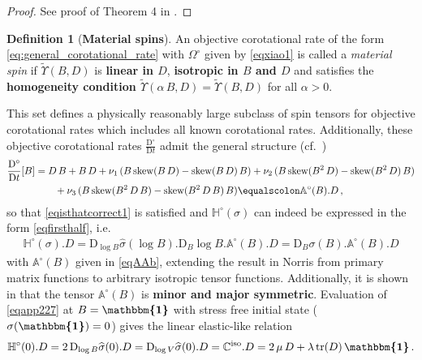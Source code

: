 \documentclass[10pt]{article}
\newcounter{theoremCounter}
\numberwithin{theoremCounter}{section}
\theoremstyle{plain}
\theoremstyle{definition}
\newtheorem{definition}[theoremCounter]{Definition}
\newcommand{\id}{{\boldsymbol{\mathbbm{1}}}}
\newcommand{\DD}{\mathrm{D}}
\DeclareMathOperator{\tr}{tr}
\DeclareMathOperator{\iso}{iso}
\def\tr{\textnormal{tr}}
\def\sk{\textnormal{skew}}
\def\C{\mathbb{C}}
\def\H{\mathbb{H}}
\numberwithin{equation}{section}
\begin{document}
%
\begin{proof}
See proof of Theorem 4 in \cite[p.~22]{xiao98_1}.
\end{proof}
%
\begin{definition}[\textbf{Material spins}] \label{appmaterialspins}
An objective corotational rate of the form \eqref{eq:general_corotational_rate} with $\Omega^{\circ}$ given by \eqref{eqxiao1} is called a \emph{material spin} if $\widetilde \Upsilon(B,D)$ is \textbf{linear in $D$}, \textbf{isotropic in $B$ and $D$} and satisfies the \textbf{homogeneity condition $\widetilde \Upsilon(\alpha \, B, D) = \widetilde \Upsilon(B,D)$} for all $\alpha > 0$.
\end{definition}
%
\noindent This set defines a physically reasonably large subclass of spin tensors for objective corotational rates which includes all known corotational rates. Additionally, these objective corotational rates $\frac{\DD^{\circ}}{\DD t}$ admit the general structure (cf.~\cite{neffkoro2024})
	\begin{equation}
	\label{eqAAb}
	\begin{alignedat}{2}
	\frac{\DD^{\circ}}{\DD t}[B] &= D \, B + B \, D + \nu_1 \, (B \, \sk(B \, D) - \sk(B \, D) \, B) +\nu_2 \, (B \, \sk(B^2 \, D) - \sk(B^2 \, D) \, B) \\
	&\qquad + \nu_3 \, (B \, \sk(B^2 \, D \, B) - \sk(B^2 \, D \, B) \, B) \equalscolon \mathbb{A}^{\circ}(B).D \, ,
	\end{alignedat}
	\end{equation}
so that \eqref{eqisthatcorrect1} is satisfied and $\H^{\circ}(\sigma)$ can indeed be expressed in the form \eqref{eqfirsthalf}, i.e.
	\begin{align}
	\label{eqapp227}
	\H^{\circ}(\sigma).D = \DD_{\log B} \widehat \sigma(\log B). \DD_B \log B. \mathbb{A}^{\circ}(B).D = \DD_B \sigma(B).\mathbb{A}^{\circ}(B).D
	\end{align}
with $\mathbb{A}^{\circ}(B)$ given in \eqref{eqAAb}, extending the result in Norris \cite[Lemma 1]{Norris2008} from primary matrix functions to arbitrary isotropic tensor functions. Additionally, it is shown in \cite{neffkoro2024} that the tensor $\mathbb{A}^{\circ}(B)$ is \textbf{minor and major symmetric}. Evaluation of \eqref{eqapp227} at $B = \id$ with stress free initial state ($\sigma(\id) = 0$) gives the linear elastic-like relation
	\begin{align}
	\H^{\circ}(0).D = 2 \, \DD_{\log B} \widehat \sigma(0).D = \DD_{\log V} \widehat \sigma(0).D = \C^{\iso}.D = 2 \, \mu \, D + \lambda \, \tr(D) \, \id \, .
	\end{align}
\end{document}
